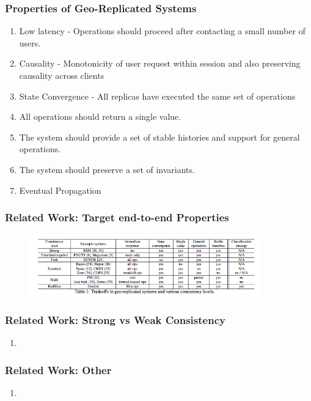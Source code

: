 \documentclass{beamer}
\begin{document}

\begin{frame}
\frametitle{Properties of Geo-Replicated Systems}
\begin{enumerate}
\item Low latency - Operations should proceed after contacting a small number of users.
\item Causality - Monotonicity of user request within session and also preserving causality across clients
\item State Convergence - All replicas have executed the same set of operations
\item All operations should return a single value.
\item The system should provide a set of stable histories and support for general operations.
\item The system should preserve a set of invariants.
\item Eventual Propagation
\end{enumerate}
\end{frame}

\begin{frame}
\frametitle{Related Work: Target end-to-end Properties}
\begin{figure}[t]
\includegraphics[width=10cm]{pic1.jpg}
\centering
\end{figure}
\end{frame}


\begin{frame}
\frametitle{Related Work: Strong vs Weak Consistency}
\begin{enumerate}
\item
\end{enumerate}

\end{frame}



\begin{frame}
\frametitle{Related Work: Other}
\begin{enumerate}
\item
\end{enumerate}

\end{frame}
\end{document}
